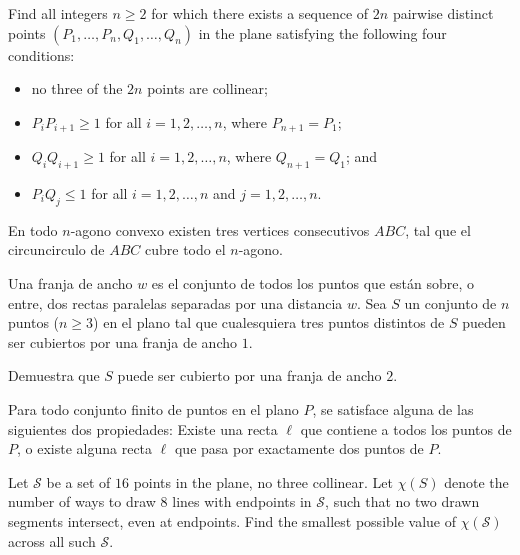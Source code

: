 \documentclass[11pt]{scrartcl}
\begin{document}
\begin{problem}
    Find all integers $n \geq 2$ for which there exists a sequence of $2n$ pairwise distinct points $(P_1, \dots, P_n, Q_1, \dots, Q_n)$ in the plane satisfying the following four conditions:

\begin{itemize}
    \item no three of the $2n$ points are collinear;

\item $P_iP_{i+1} \ge 1$ for all $i = 1, 2, \dots ,n$, where $P_{n+1}=P_1$;
\item $Q_iQ_{i+1} \ge 1$ for all $i = 1, 2, \dots, n$, where $Q_{n+1} = Q_1$; and
\item $P_iQ_j \le 1$ for all $i = 1, 2, \dots, n$ and $j = 1, 2, \dots, n$.
\end{itemize}
\end{problem}

\begin{problem}
    En todo $n$-agono convexo existen tres vertices consecutivos $ABC$, tal que el circuncirculo de $ABC$ cubre todo el $n$-agono.
\end{problem}

\begin{problem} [Balkan 2010/3]
    Una franja de ancho $w$ es el conjunto de todos los puntos que están sobre, o entre, dos rectas paralelas separadas por una distancia $w$. Sea $S$ un conjunto de $n$ puntos ($n \ge 3$) en el plano tal que cualesquiera tres puntos distintos de $S$ pueden ser cubiertos por una franja de ancho $1$.

Demuestra que $S$ puede ser cubierto por una franja de ancho $2$.
\end{problem}

\begin{problem} 
    Para todo conjunto finito de puntos en el plano $P$, se satisface alguna de las siguientes dos propiedades: Existe una recta $\ell$ que contiene a todos los puntos de $P$, o existe alguna recta $\ell$ que pasa por exactamente dos puntos de $P$.  
\end{problem}

\begin{problem} 
    Let $\mathcal S$ be a set of $16$ points in the plane, no three collinear. Let $\chi(S)$ denote the number of ways to draw $8$ lines with endpoints in $\mathcal S$, such that no two drawn segments intersect, even at endpoints. Find the smallest possible value of $\chi(\mathcal S)$ across all such $\mathcal S$.
\end{problem}
\end{document}
